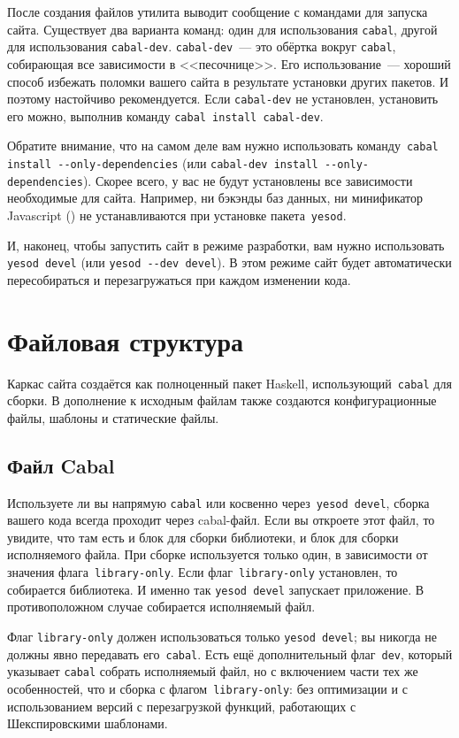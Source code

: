 После создания файлов утилита выводит сообщение с командами для запуска сайта.
Существует два варианта команд: один для использования \texttt{cabal},
другой для использования \texttt{cabal-dev}. \texttt{cabal-dev}~--- это обёртка
вокруг \texttt{cabal}, собирающая все зависимости в <<песочнице>>. Его
использование~--- хороший способ избежать поломки вашего сайта в результате установки других пакетов.
И поэтому настойчиво рекомендуется.
Если \texttt{cabal-dev} не установлен, установить его можно, выполнив команду
\texttt{cabal install cabal-dev}.

Обратите внимание, что на самом деле вам нужно использовать команду~\texttt{cabal install -{}-only-dependencies}
(или \texttt{cabal-dev install -{}-only-dependencies}). Скорее всего, у вас не будут
установлены все зависимости необходимые для сайта. Например, ни бэкэнды
баз данных, ни минификатор Javascript ()
не устанавливаются при установке пакета~\texttt{yesod}.

И, наконец, чтобы запустить сайт в режиме разработки, вам нужно использовать
\texttt{yesod devel} (или \texttt{yesod -{}-dev devel}). В этом режиме сайт будет автоматически
пересобираться и перезагружаться при каждом изменении кода.

\section{Файловая структура}
Каркас сайта создаётся как полноценный пакет Haskell,
использующий~\texttt{cabal} для сборки. В дополнение к исходным файлам также
создаются конфигурационные файлы, шаблоны и статические файлы.

\subsection{Файл Cabal}
Используете ли вы напрямую \texttt{cabal} или косвенно через~\texttt{yesod
    devel}, сборка вашего кода всегда проходит через cabal-файл. Если вы
откроете этот файл, то увидите, что там есть и блок для сборки библиотеки, и
блок для сборки исполняемого файла. При сборке используется только один, в
зависимости от значения флага~\texttt{library-only}. Если
флаг~\texttt{library-only} установлен, то собирается библиотека. И именно так
\texttt{yesod devel} запускает приложение.  В противоположном случае собирается
исполняемый файл.

Флаг \texttt{library-only} должен использоваться только \texttt{yesod devel};
вы никогда не должны явно передавать его~\texttt{cabal}. Есть ещё
дополнительный флаг~\texttt{dev}, который указывает \texttt{cabal} собрать
исполняемый файл, но с включением части тех же особенностей, что и сборка с
флагом~\texttt{library-only}: без оптимизации и с использованием версий с
перезагрузкой функций, работающих с Шекспировскими шаблонами.

